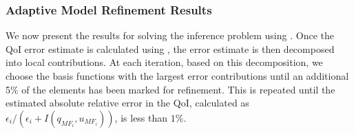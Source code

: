 \documentclass[review,sort&compress]{elsarticle}
\theoremstyle{plain} %
\theoremstyle{definition} %
\begin{document}
\subsubsection{Adaptive Model Refinement Results} \label{sec:cdvcdrBaseRef}
%

We now present the results for solving the inference problem using . Once the QoI error estimate is calculated using , the error estimate is then decomposed into local contributions. At each iteration, based on this decomposition, we choose the basis functions with the largest error contributions until an additional 5\% of the elements has been marked for refinement. This is repeated until the estimated absolute relative error in the QoI, calculated as $\epsilon_i/(\epsilon_i+I(q_{MF_i},u_{MF_i}))$, is less than $1\%$.
\end{document}
